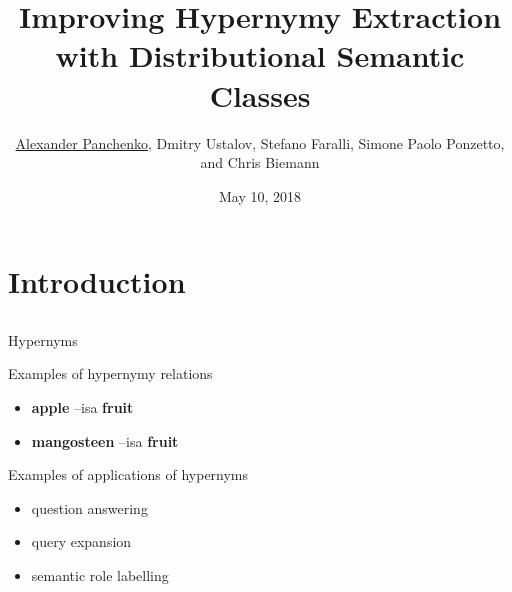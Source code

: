 \documentclass[usenames,dvipsnames]{beamer}
\title{Improving Hypernymy Extraction with Distributional Semantic Classes}
\author[Panchenko et al. LREC'18]{\underline{Alexander Panchenko}, Dmitry Ustalov, Stefano Faralli, Simone Paolo Ponzetto, and Chris Biemann}
\date[10.05.2018]{May 10, 2018}
\begin{document}
\maketitle

%
\section{Introduction}
\subsection{}


\begin{frame}{Hypernyms}

\begin{block}{Examples of hypernymy relations}
\begin{itemize}
	\item \textbf{apple} --isa\textrightarrow \textbf{ fruit}
	\item \textbf{mangosteen} --isa\textrightarrow \textbf{ fruit}
\end{itemize}
\end{block}

\pause

\begin{block}{Examples of applications of hypernyms}
\begin{itemize}
	\item question answering~\cite{Zhou:13} 
	\item query expansion~\cite{gong2005web}
	\item semantic role labelling~\cite{shi2005putting} 
\end{itemize}
\end{block}
\end{frame}

\end{document}
